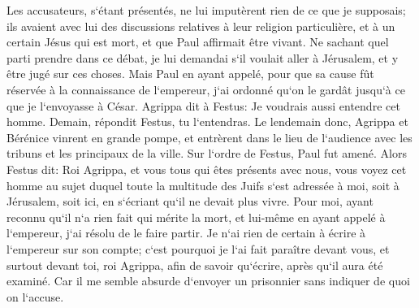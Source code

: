 \verse Les accusateurs, s`étant présentés, ne lui imputèrent rien de ce que je supposais; 
\verse ils avaient avec lui des discussions relatives à leur religion particulière, et à un certain Jésus qui est mort, et que Paul affirmait être vivant. 
\verse Ne sachant quel parti prendre dans ce débat, je lui demandai s`il voulait aller à Jérusalem, et y être jugé sur ces choses. 
\verse Mais Paul en ayant appelé, pour que sa cause fût réservée à la connaissance de l`empereur, j`ai ordonné qu`on le gardât jusqu`à ce que je l`envoyasse à César. 
\verse Agrippa dit à Festus: Je voudrais aussi entendre cet homme. Demain, répondit Festus, tu l`entendras. 
\verse Le lendemain donc, Agrippa et Bérénice vinrent en grande pompe, et entrèrent dans le lieu de l`audience avec les tribuns et les principaux de la ville. Sur l`ordre de Festus, Paul fut amené. 
\verse Alors Festus dit: Roi Agrippa, et vous tous qui êtes présents avec nous, vous voyez cet homme au sujet duquel toute la multitude des Juifs s`est adressée à moi, soit à Jérusalem, soit ici, en s`écriant qu`il ne devait plus vivre. 
\verse Pour moi, ayant reconnu qu`il n`a rien fait qui mérite la mort, et lui-même en ayant appelé à l`empereur, j`ai résolu de le faire partir. 
\verse Je n`ai rien de certain à écrire à l`empereur sur son compte; c`est pourquoi je l`ai fait paraître devant vous, et surtout devant toi, roi Agrippa, afin de savoir qu`écrire, après qu`il aura été examiné. 
\verse Car il me semble absurde d`envoyer un prisonnier sans indiquer de quoi on l`accuse. 

